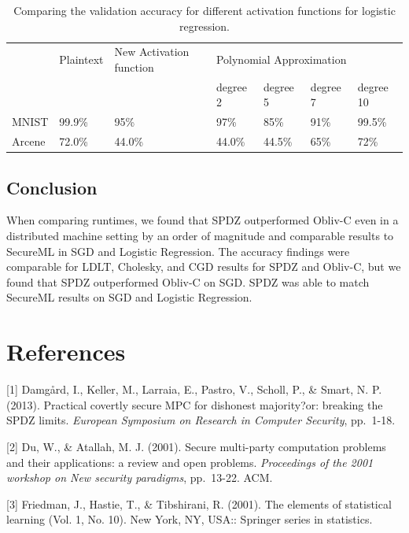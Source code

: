 \documentclass{article}
\begin{document}
\begin{table}[h!] 
\caption{Comparing the validation accuracy for different activation functions for logistic regression.}
\centering
\label{my-label}
\begin{tabular}{@{}lllllll@{}}
\toprule
       & Plaintext & New Activation function & \multicolumn{4}{l}{Polynomial Approximation} \\
       &           &                         & degree 2  & degree 5  & degree 7 & degree 10 \\ \midrule
MNIST  & 99.9\%    & 95\%                    & 97\%      & 85\%      & 91\%     & 99.5\%    \\
Arcene & 72.0\%    &           44.0\%              &   44.0\%        &    44.5\%       &    65\%      &    72\%       \\ \bottomrule
\end{tabular}
\vspace{-4mm}
\end{table}

\subsection{Conclusion}

When comparing runtimes, we found that SPDZ outperformed Obliv-C even in a distributed machine setting by an order of magnitude and comparable results to SecureML in SGD and Logistic Regression. The accuracy findings were comparable for LDLT, Cholesky, and CGD results for SPDZ and Obliv-C, but we found that SPDZ outperformed Obliv-C on SGD. SPDZ was able to match SecureML results on SGD and Logistic Regression.

\section*{References}

\small

[1] Damg\aa rd, I., Keller, M., Larraia, E., Pastro, V., Scholl, P., \& Smart, N. P. (2013). Practical covertly secure MPC for dishonest majority?or: breaking the SPDZ limits. {\it European Symposium on Research in Computer Security}, pp.\ 1-18.

[2] Du, W., \& Atallah, M. J. (2001). Secure multi-party computation problems and their applications: a review and open problems. {\it Proceedings of the 2001 workshop on New security paradigms}, pp.\ 13-22. ACM.

[3] Friedman, J., Hastie, T., \& Tibshirani, R. (2001). The elements of statistical learning (Vol. 1, No. 10). New York, NY, USA:: Springer series in statistics.
\end{document}
